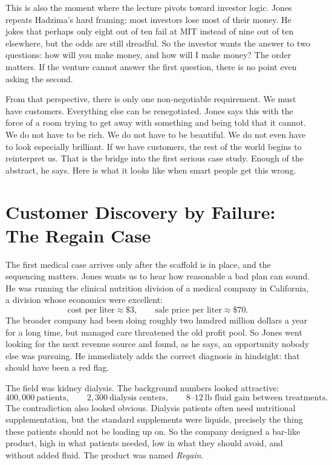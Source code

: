 This is also the moment where the lecture pivots toward investor logic. Jones repeats Hadzima's hard framing: most investors lose most of their money. He jokes that perhaps only eight out of ten fail at MIT instead of nine out of ten elsewhere, but the odds are still dreadful. So the investor wants the answer to two questions: how will you make money, and how will I make money? The order matters. If the venture cannot answer the first question, there is no point even asking the second.

From that perspective, there is only one non-negotiable requirement. We must have customers. Everything else can be renegotiated. Jones says this with the force of a room trying to get away with something and being told that it cannot. We do not have to be rich. We do not have to be beautiful. We do not even have to look especially brilliant. If we have customers, the rest of the world begins to reinterpret us. That is the bridge into the first serious case study. Enough of the abstract, he says. Here is what it looks like when smart people get this wrong.

\section{Customer Discovery by Failure: The Regain Case}

The first medical case arrives only after the scaffold is in place, and the sequencing matters. Jones wants us to hear how reasonable a bad plan can sound. He was running the clinical nutrition division of a medical company in California, a division whose economics were excellent:
\begin{equation}
\text{cost per liter}\approx \$3,
\qquad
\text{sale price per liter}\approx \$70.
\end{equation}
The broader company had been doing roughly two hundred million dollars a year for a long time, but managed care threatened the old profit pool. So Jones went looking for the next revenue source and found, as he says, an opportunity nobody else was pursuing. He immediately adds the correct diagnosis in hindsight: that should have been a red flag.

The field was kidney dialysis. The background numbers looked attractive:
\begin{equation}
400{,}000\ \text{patients},
\qquad
2{,}300\ \text{dialysis centers},
\qquad
8\text{--}12\ \text{lb fluid gain between treatments}.
\end{equation}
The contradiction also looked obvious. Dialysis patients often need nutritional supplementation, but the standard supplements were liquids, precisely the thing these patients should not be loading up on. So the company designed a bar-like product, high in what patients needed, low in what they should avoid, and without added fluid. The product was named \emph{Regain}.

